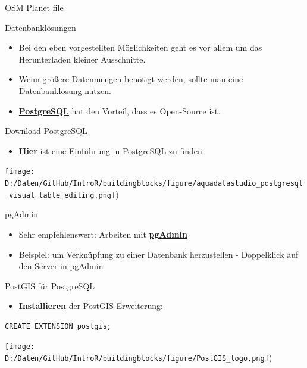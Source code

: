 \documentclass[ignorenonframetext,]{beamer}
\providecommand{\tightlist}{%
  \setlength{\itemsep}{0pt}\setlength{\parskip}{0pt}}
\begin{document}
\begin{frame}{OSM Planet file}

\begin{block}{Datenbanklösungen}

\begin{itemize}
\tightlist
\item
  Bei den eben vorgestellten Möglichkeiten geht es vor allem um das
  Herunterladen kleiner Ausschnitte.
\item
  Wenn größere Datenmengen benötigt werden, sollte man eine
  Datenbanklösung nutzen.
\item
  \href{http://www.postgresql.org/}{\textbf{PostgreSQL}} hat den
  Vorteil, dass es Open-Source ist.
\end{itemize}

\end{block}

\end{frame}

\begin{frame}{\href{http://www.postgresql.org/download/windows/}{Download
PostgreSQL}}

\begin{itemize}
\tightlist
\item
  \href{https://datashenanigan.wordpress.com/2015/05/18/getting-started-with-postgresql-in-r/}{\textbf{Hier}}
  ist eine Einführung in PostgreSQL zu finden
\end{itemize}

\texttt{[image: D:/Daten/GitHub/IntroR/buildingblocks/figure/aquadatastudio\_postgresql\_visual\_table\_editing.png]})

\end{frame}

\begin{frame}{pgAdmin}

\begin{itemize}
\tightlist
\item
  Sehr empfehlenswert: Arbeiten mit
  \href{https://www.pgadmin.org/}{\textbf{pgAdmin}}
\item
  Beispiel: um Verknüpfung zu einer Datenbank herzustellen - Doppelklick
  auf den Server in pgAdmin
\end{itemize}

\end{frame}

\begin{frame}[fragile]{PostGIS für PostgreSQL}

\begin{itemize}
\tightlist
\item
  \href{http://postgis.net/install/}{\textbf{Installieren}} der PostGIS
  Erweiterung:
\end{itemize}

\begin{verbatim}
CREATE EXTENSION postgis;
\end{verbatim}

\texttt{[image: D:/Daten/GitHub/IntroR/buildingblocks/figure/PostGIS\_logo.png]})

\end{frame}
\end{document}
